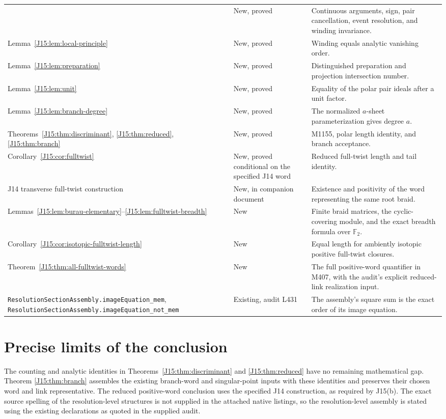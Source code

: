 \documentclass[11pt,oneside]{report}
\theoremstyle{definition}
\numberwithin{equation}{section}
\newcommand{\decl}[1]{\textnormal{\nolinkurl{#1}}}
\begin{document}
\begin{longtable}{@{}>{\raggedright\arraybackslash}p{}>{\raggedright\arraybackslash}p{}>{\raggedright\arraybackslash}p{}@{}}
& New, proved & Continuous arguments, sign, pair cancellation, event resolution, and winding invariance.\\
Lemma~\ref{J15:lem:local-principle}
& New, proved & Winding equals analytic vanishing order.\\
Lemma~\ref{J15:lem:preparation}
& New, proved & Distinguished preparation and projection intersection number.\\
Lemma~\ref{J15:lem:unit}
& New, proved & Equality of the polar pair ideals after a unit factor.\\
Lemma~\ref{J15:lem:branch-degree}
& New, proved & The normalized $a$-sheet parameterization gives degree $a$.\\
Theorems~\ref{J15:thm:discriminant}, \ref{J15:thm:reduced}, \ref{J15:thm:branch}
& New, proved & M1155, polar length identity, and branch acceptance.\\
Corollary~\ref{J15:cor:fulltwist}
& New, proved conditional on the specified J14 word & Reduced full-twist length and tail identity.\\
J14 transverse full-twist construction
& New, in companion document & Existence and positivity of the word representing the same root braid.\\
\bottomrule
Lemmas~\ref{J15:lem:burau-elementary}--\ref{J15:lem:fulltwist-breadth}
& New & Finite braid matrices, the cyclic-covering module, and the exact
breadth formula over $\mathbb F_2$.\\
Corollary~\ref{J15:cor:isotopic-fulltwist-length}
& New & Equal length for ambiently isotopic positive full-twist closures.\\
Theorem~\ref{J15:thm:all-fulltwist-words}
& New & The full positive-word quantifier in M407, with the audit's
explicit reduced-link realization input.\\
\decl{ResolutionSectionAssembly.imageEquation_mem},
\decl{ResolutionSectionAssembly.imageEquation_not_mem}
& Existing, audit L431 & The assembly's square sum is the exact order
of its image equation.\\
\end{longtable}
\normalsize

\section{Precise limits of the conclusion}\label{J15:sec:scope}

The counting and analytic identities in Theorems~\ref{J15:thm:discriminant}
and \ref{J15:thm:reduced} have no remaining mathematical gap. Theorem
\ref{J15:thm:branch} assembles the existing branch-word and singular-point
inputs with these identities and preserves their chosen word and link
representative. The reduced positive-word conclusion uses the specified
J14 construction, as required by J15(b). The exact source spelling of the
resolution-level structures is not supplied in the attached native listings,
so the resolution-level assembly is stated using the existing declarations
as quoted in the supplied audit.
\end{document}
